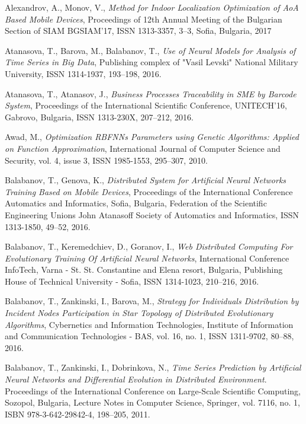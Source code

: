 \documentclass{llncs}
\begin{document}
\begin{thebibliography}{99}

 Alexandrov, A., Monov, V., \textit{Method for Indoor Localization Optimization of AoA Based Mobile Devices}, Proceedings of 12th Annual Meeting of the Bulgarian Section of SIAM BGSIAM’17, ISSN 1313-3357, 3--3, Sofia, Bulgaria, 2017

 Atanasova, T., Barova, M., Balabanov, T., \textit{Use of Neural Models for Analysis of Time Series in Big Data}, Publishing complex of "Vasil Levski" National Military University, ISSN 1314-1937, 193--198, 2016.

 Atanasova, T., Atanasov, J., \textit{Business Processes Traceability in SME by Barcode System}, Proceedings of the International Scientific Conference, UNITECH’16, Gabrovo, Bulgaria, ISSN 1313-230X,  207--212, 2016.

 Awad, M., \textit{Optimization RBFNNs Parameters using Genetic Algorithms: Applied on Function Approximation}, International Journal of Computer Science and Security, vol. 4, issue 3, ISSN 1985-1553, 295--307, 2010.

 Balabanov, T., Genova, K., \textit{Distributed System for Artificial Neural Networks Training Based on Mobile Devices}, Proceedings of the International Conference Automatics and Informatics, Sofia, Bulgaria, Federation of the Scientific Engineering Unions John Atanasoff Society of Automatics and Informatics, ISSN 1313-1850, 49--52, 2016.

 Balabanov, T., Keremedchiev, D., Goranov, I., \textit{Web Distributed Computing For Evolutionary Training Of Artificial Neural Networks}, International Conference InfoTech, Varna - St. St. Constantine and Elena resort, Bulgaria, Publishing House of Technical University - Sofia, ISSN 1314-1023, 210--216, 2016.

 Balabanov, T., Zankinski, I., Barova, M., \textit{Strategy for Individuals Distribution by Incident Nodes Participation in Star Topology of Distributed Evolutionary Algorithms}, Cybernetics and Information Technologies, Institute of Information and Communication Technologies - BAS, vol. 16, no. 1, ISSN 1311-9702, 80--88, 2016.

 Balabanov, T., Zankinski, I., Dobrinkova, N., \textit{Time Series Prediction by Artificial Neural Networks and Differential Evolution in Distributed Environment}. Proceedings of the International Conference on Large-Scale Scientific Computing, Sozopol, Bulgaria, Lecture Notes in Computer Science, Springer, vol. 7116, no. 1, ISBN 978-3-642-29842-4, 198–205, 2011. 


\end{thebibliography}
\end{document}
